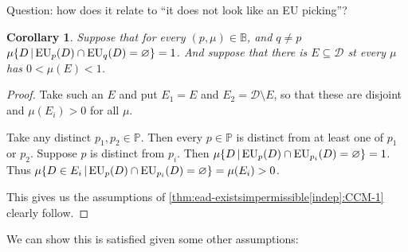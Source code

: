 \documentclass[a4paper]{article}
\newtheorem{theorem}{Theorem}
\newtheorem{corollary}[theorem]{Corollary}
\renewcommand\P{\mathbb{P}} %
\newcommand\EU{\mathrm{EU}}
\newcommand\EAd{\mathrm{EAd}}
\newcommand{\Decs}{\mathcal{D}}
\newcommand{\n}{\mathsf{n}}
\newcommand{\IB}{\mathbb{B}}
\newcommand{\IP}{\P}
\newcommand\SetDelimiter[1][]{
	\nonscript\,#1\vert \allowbreak \nonscript\,\mathopen{}}
\providecommand\given{\SetDelimiter}
\renewcommand{\emptyset}{\varnothing}
\newenvironment{CCM rewritten}
{\begingroup\color{blue}} %
{\endgroup}              %
\begin{document}


Question: how does it relate to ``it does not look like an EU picking''?

%			

\begin{corollary}
	Suppose that for every $(p,\mu)\in\IB$, and $q\neq p$ $\mu\{D\given \EU_p(D)\cap \EU_q(D)=\emptyset\}=1$. And suppose that there is $E\subseteq\Decs$ st every $\mu$ has $0<\mu(E)<1$.
\end{corollary}
\begin{proof}
	Take such an $E$ and put $E_1=E$ and $E_2=\Decs\setminus E$, so that these are disjoint and $\mu(E_i)>0$ for all $\mu$. 
	
	Take any distinct $p_1,p_2\in\IP$.  Then every $p\in\IP$ is distinct from at least one of $p_1$ or $p_2$. Suppose $p$ is distinct from $p_i$. Then $\mu\{D\given \EU_p(D)\cap \EU_{p_i}(D)=\emptyset\}=1$. Thus $\mu\{D\in E_i\given\EU_p(D)\cap \EU_{p_i}(D)=\emptyset\}=\mu(E_i)>0$. 
	
	This gives us the assumptions of \cref{thm:ead-existsimpermissible[indep]:CCM-1} clearly follow. 
\end{proof}


We can show this is satisfied given some other assumptions:
\end{document}
